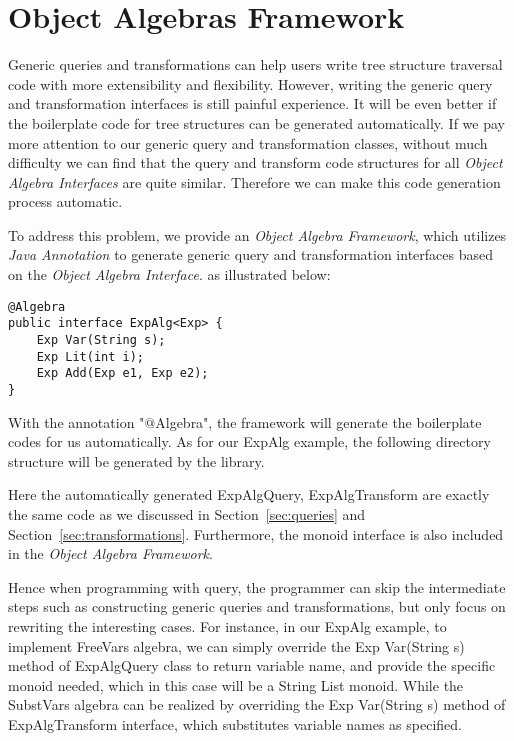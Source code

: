 \section{Object Algebras Framework}

Generic queries and transformations can help users write tree structure traversal code with more extensibility and flexibility. However, writing the generic query and transformation interfaces is still painful experience. It will be even better if the boilerplate code for tree structures can be generated automatically. If we pay more attention to our generic query and transformation classes, without much difficulty we can find that the query and transform code structures for all \emph{Object Algebra Interfaces} are quite similar. Therefore we can make this code generation process automatic. 

To address this problem, we provide an \emph{Object Algebra Framework}, which utilizes \emph{Java Annotation} to generate generic query and transformation interfaces based on the \emph{Object Algebra Interface}. as illustrated below: 
\begin{lstlisting}[numbers=none] 
@Algebra
public interface ExpAlg<Exp> {
	Exp Var(String s);
	Exp Lit(int i);
	Exp Add(Exp e1, Exp e2);
}
\end{lstlisting}

With the annotation "$@$Algebra", the framework will generate the boilerplate codes for us automatically. As for our ExpAlg example, the following directory structure will be generated by the library. 

Here the automatically generated ExpAlgQuery, ExpAlgTransform are exactly the same code as we discussed in Section~\ref{sec:queries} and Section~\ref{sec:transformations}. Furthermore, the monoid interface is also included in the \emph{Object Algebra Framework}.

Hence when programming with query, the programmer can skip the intermediate steps such as constructing generic queries and transformations, but only focus on rewriting the interesting cases. For instance, in our ExpAlg example, to implement FreeVars algebra, we can simply override the Exp Var(String s) method of ExpAlgQuery class to return variable name, and provide the specific monoid needed, which in this case will be a String List monoid. While the SubstVars algebra can be realized by overriding the Exp Var(String s) method of ExpAlgTransform interface, which substitutes variable names as specified. 
